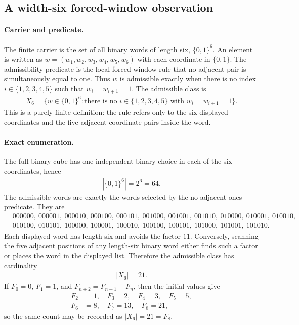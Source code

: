 \subsection{A width-six forced-window observation}
\label{sec:window6-three-rigidity-window-observation}

\paragraph{Carrier and predicate.}
The finite carrier is the set of all binary words of length six,
$\{0,1\}^6$.  An element is written as
$w=(w_1,w_2,w_3,w_4,w_5,w_6)$ with each coordinate in $\{0,1\}$.  The admissibility predicate is the local forced-window rule
that no adjacent pair is simultaneously equal to one.  Thus
$w$ is admissible exactly when there is no index $i\in\{1,2,3,4,5\}$ such that $w_i=w_{i+1}=1$.  The admissible class is
$$
\begin{aligned}
X_6=\{w\in\{0,1\}^6 : \text{there is no } i\in\{1,2,3,4,5\}\text{ with } w_i=w_{i+1}=1\}.
\end{aligned}
$$
This is a purely finite definition: the rule refers only to the six displayed coordinates and the five adjacent coordinate pairs inside the word.

\paragraph{Exact enumeration.}
The full binary cube has one independent binary choice in each of the six coordinates, hence
$$
\begin{aligned}
|\{0,1\}^6|=2^6=64.
\end{aligned}
$$
The admissible words are exactly the words selected by the no-adjacent-ones predicate.  They are
$$
\begin{aligned}
&000000,\ 000001,\ 000010,\ 000100,\ 000101,\ 001000,\ 001001,\ 001010,\ 010000,\ 010001,\ 010010,\\
&010100,\ 010101,\ 100000,\ 100001,\ 100010,\ 100100,\ 100101,\ 101000,\ 101001,\ 101010.
\end{aligned}
$$
Each displayed word has length six and avoids the factor $11$.  Conversely, scanning the five adjacent positions of any length-six binary word either finds such a factor or places the word in the displayed list.  Therefore the admissible class has cardinality
$$
\begin{aligned}
|X_6|=21.
\end{aligned}
$$
If $F_0=0$, $F_1=1$, and $F_{n+2}=F_{n+1}+F_n$, then the initial values give
$$
\begin{aligned}
F_2&=1,\quad F_3=2,\quad F_4=3,\quad F_5=5,\\
F_6&=8,\quad F_7=13,\quad F_8=21,
\end{aligned}
$$
so the same count may be recorded as $|X_6|=21=F_8$.

